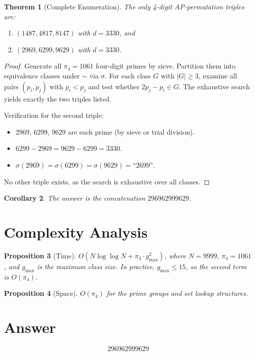 \documentclass[12pt]{article}
\newtheorem{theorem}{Theorem}
\newtheorem{corollary}[theorem]{Corollary}
\newtheorem{proposition}[theorem]{Proposition}
\begin{document}
\begin{theorem}[Complete Enumeration]\label{thm:main}
The only 4-digit AP-permutation triples are:
\begin{enumerate}
\item $(1487, 4817, 8147)$ with $d = 3330$, and
\item $(2969, 6299, 9629)$ with $d = 3330$.
\end{enumerate}
\end{theorem}

\begin{proof}
Generate all $\pi_4 = 1061$ four-digit primes by sieve. Partition them into equivalence classes under $\sim$ via $\sigma$. For each class $G$ with $|G| \geq 3$, examine all pairs $(p_i, p_j)$ with $p_i < p_j$ and test whether $2p_j - p_i \in G$. The exhaustive search yields exactly the two triples listed.

Verification for the second triple:
\begin{itemize}
\item $2969$, $6299$, $9629$ are each prime (by sieve or trial division).
\item $6299 - 2969 = 9629 - 6299 = 3330$.
\item $\sigma(2969) = \sigma(6299) = \sigma(9629) = \text{``2699''}$.
\end{itemize}
No other triple exists, as the search is exhaustive over all classes.
\end{proof}

\begin{corollary}
The answer is the concatenation $296962999629$.
\end{corollary}

\section{Complexity Analysis}

\begin{proposition}[Time]
$O(N \log \log N + \pi_4 \cdot g_{\max}^2)$, where $N = 9999$, $\pi_4 = 1061$, and $g_{\max}$ is the maximum class size. In practice, $g_{\max} \leq 15$, so the second term is $O(\pi_4)$.
\end{proposition}

\begin{proposition}[Space]
$O(\pi_4)$ for the prime groups and set lookup structures.
\end{proposition}

\section{Answer}

\[
\boxed{296962999629}
\]
\end{document}
